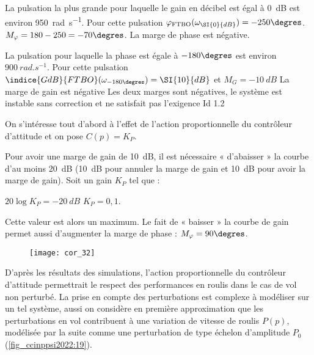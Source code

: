 \ifprof
\begin{corrige}
La pulsation la plus grande pour laquelle le gain en décibel est égal à \SI{0}{dB} est environ \SI{950}{rad.s^{-1}}. Pour cette pulsation $\varphi_{\text{FTBO}} (\omega_{\SI{0}{dB}} )=-250\degres$.
$M_{\varphi}=180-250=-70\degres$. La marge de phase est négative. 

La pulsation pour laquelle la phase est égale à $-180\degres$ est environ $\SI{900}{rad.s^{-1}}$. Pour cette pulsation $\indice{GdB}{FTBO}(\omega_{-180\degres} )=\SI{10}{dB}$ et $M_G=-\SI{10}{dB}$
La marge de gain est négative
Les deux marges sont négatives, le système est instable sans correction et ne satisfait pas l’exigence Id 1.2

\end{corrige}
\else
\fi

\ifprof
\else
On s’intéresse tout d’abord à l’effet de l’action proportionnelle du contrôleur d’attitude et on
pose $C(p) = K_P$.
\fi

\ifprof
\begin{corrige}
Pour avoir une marge de gain de \SI{10}{dB}, il est nécessaire « d’abaisser » la courbe d’au moins \SI{20}{dB} (\SI{10}{dB} pour annuler la marge de gain et \SI{10}{dB} pour avoir la marge de gain). Soit un gain $K_P$ tel que :

$20 \log K_P = \SI{-20}{dB}$ $K_P = 0,1$.

Cette valeur est alors un maximum. Le fait de « baisser » la courbe de gain permet aussi d’augmenter la marge de phase :  $M_{\varphi}=90\degres$.

\begin{figure}[H]
\centering
\texttt{[image: cor\_32]}
\end{figure}

\end{corrige}
\else
\fi


\ifprof
\else
D’après les résultats des simulations, l’action proportionnelle du contrôleur d’attitude permettrait le respect des performances en roulis dans le cas de vol non perturbé. La prise en
compte des perturbations est complexe à modéliser sur un tel système, aussi on considère
en première approximation que les perturbations en vol contribuent à une variation de vitesse
de roulis $P(p)$, modélisée par la suite comme une perturbation de type échelon d’amplitude $P_0$
(\autoref{fig_ccinppsi2022:19}).

